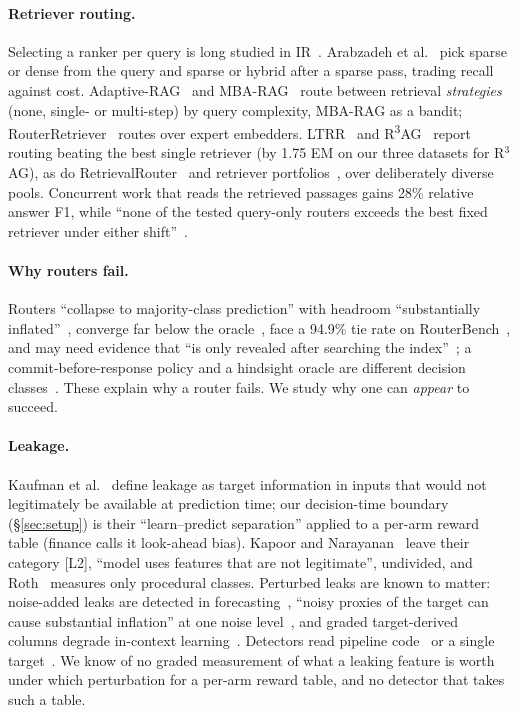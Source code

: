 \documentclass{article}
\begin{document}
\paragraph{Retriever routing.} Selecting a ranker per query is long studied in
IR~\cite{balasubramanian2010rankers}. Arabzadeh et al.~\cite{arabzadeh2021bertselect} pick sparse or dense
from the query and sparse or hybrid after a sparse pass, trading recall against cost. Adaptive-RAG~\cite{jeong2024adaptiverag}
and MBA-RAG~\cite{tang2025mbarag} route between retrieval \emph{strategies} (none, single- or
multi-step) by query complexity, MBA-RAG as a bandit; RouterRetriever~\cite{campos2024routerretriever}
routes over expert embedders. LTRR~\cite{qin2024ltrr} and \mbox{R\textsuperscript{3}AG}~\cite{zhao2026r3ag}
report routing beating the best single retriever (by 1.75 EM on our three datasets for R$^3$AG),
as do RetrievalRouter~\cite{kuru2026retrievalrouter} and retriever
portfolios~\cite{stouras2026portfolios}, over deliberately diverse pools. Concurrent work that
reads the retrieved passages gains 28\% relative answer F1, while ``none of the tested query-only
routers exceeds the best fixed retriever under either shift''~\cite{six2026ragcompass}.

\paragraph{Why routers fail.} Routers ``collapse to majority-class prediction'' with headroom
``substantially inflated''~\cite{garg2026unsolvability}, converge far below the
oracle~\cite{lu2026routingplateau}, face a 94.9\% tie rate on RouterBench~\cite{lai2026routing},
and may need evidence that ``is only revealed after searching the index''~\cite{hussain2026coverage};
a commit-before-response policy and a hindsight oracle are different decision
classes~\cite{chen2026routinggap}. These explain why a router fails. We study why one can
\emph{appear} to succeed.

\paragraph{Leakage.} Kaufman et al.~\cite{kaufman2012leakage} define leakage as target information
in inputs that would not legitimately be available at prediction time; our decision-time boundary
(\S\ref{sec:setup}) is their ``learn--predict separation'' applied to a per-arm reward table
(finance calls it look-ahead bias). Kapoor and Narayanan~\cite{kapoor2023leakage} leave their
category [L2], ``model uses features that are not legitimate'', undivided, and
Roth~\cite{roth2026leakagetypes} measures only procedural classes. Perturbed leaks are known to
matter: noise-added leaks are detected in forecasting~\cite{talagala2024tsdataleaks}, ``noisy proxies
of the target can cause substantial inflation'' at one noise level~\cite{bioleak2026}, and graded
target-derived columns degrade in-context learning~\cite{upendra2026supportset}. Detectors read
pipeline code~\cite{leakagedetector2025} or a single target~\cite{bioleak2026}. We know of no graded
measurement of what a leaking feature is worth under which perturbation for a per-arm reward
table, and no detector that takes such a table.
\end{document}
